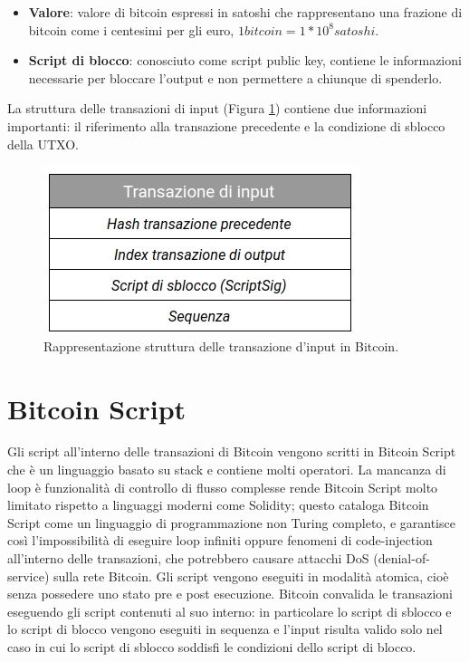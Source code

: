 \begin{itemize}
  \item {\bf Valore\/}: valore di bitcoin espressi in satoshi che rappresentano una frazione di bitcoin come i centesimi per gli euro, \( 1 bitcoin = 1*10^8 satoshi \).
  \item {\bf Script di blocco\/}: conosciuto come script public key, contiene le informazioni necessarie per bloccare l’output e non permettere a chiunque di spenderlo.
\end{itemize}

La struttura delle transazioni di input (Figura \ref{fig:inputtransaztionbitcoin}) contiene due informazioni importanti: il riferimento alla transazione precedente e la condizione di sblocco della UTXO.

\begin{figure}[H]
\begin{center}
\includegraphics[width=0.6\columnwidth]{images/input-transactions-bitcoin.png}
\end{center}
\caption{Rappresentazione struttura delle transazione d’input in Bitcoin.}
\label{fig:inputtransaztionbitcoin}
\end{figure}

\section{Bitcoin Script}
\label{sec:bitcoin script}

Gli script all’interno delle transazioni di Bitcoin vengono scritti in Bitcoin Script che è un linguaggio basato su stack e contiene molti operatori.
La mancanza di loop è funzionalità di controllo di flusso complesse rende Bitcoin Script molto limitato rispetto a linguaggi moderni come Solidity; questo cataloga Bitcoin Script come un linguaggio di programmazione non Turing completo, e garantisce così l’impossibilità di eseguire loop infiniti oppure fenomeni di code-injection all’interno delle transazioni, che potrebbero causare attacchi DoS (denial-of-service) sulla rete Bitcoin.
Gli script vengono eseguiti in modalità atomica, cioè senza possedere uno stato pre e post esecuzione. Bitcoin convalida le transazioni eseguendo gli script contenuti al suo interno: in particolare lo script di sblocco e lo script di blocco vengono eseguiti in sequenza e l'input risulta valido solo nel caso in cui lo script di sblocco soddisfi le condizioni dello script di blocco.

